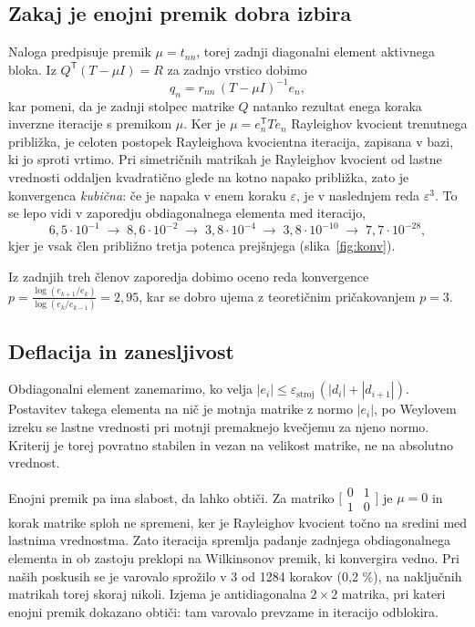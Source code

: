 \documentclass[11pt,a4paper]{article}
\begin{document}
\subsection{Zakaj je enojni premik dobra izbira}
 
Naloga predpisuje premik $\mu = t_{nn}$, torej zadnji diagonalni element
aktivnega bloka. Iz $Q^{\mathsf T}(T-\mu I) = R$ za
zadnjo vrstico dobimo
\begin{equation}
  q_n = r_{nn}\,(T-\mu I)^{-1} e_n ,
\end{equation}
kar pomeni, da je zadnji stolpec matrike $Q$ natanko rezultat enega koraka
inverzne iteracije s premikom $\mu$. Ker je $\mu = e_n^{\mathsf T} T e_n$
Rayleighov kvocient trenutnega približka, je celoten postopek Rayleighova
kvocientna iteracija, zapisana v bazi, ki jo sproti vrtimo. Pri simetričnih
matrikah je Rayleighov kvocient od lastne vrednosti oddaljen kvadratično glede
na kotno napako približka, zato je konvergenca \emph{kubična}: če je napaka v
enem koraku $\varepsilon$, je v naslednjem reda $\varepsilon^3$. To se lepo vidi
v zaporedju obdiagonalnega elementa med iteracijo,
\[
  6{,}5\cdot 10^{-1} \;\to\;
  8{,}6\cdot 10^{-2} \;\to\;
  3{,}8\cdot 10^{-4} \;\to\;
  3{,}8\cdot 10^{-10} \;\to\;
  7{,}7\cdot 10^{-28},
\]
kjer je vsak člen približno tretja potenca prejšnjega (slika~\ref{fig:konv}).

Iz zadnjih treh členov zaporedja dobimo oceno reda konvergence $p = \frac{\log(e_{k+1}/e_k)}{\log(e_k/e_{k-1})} = 2{,}95$, 
kar se dobro ujema z teoretičnim pričakovanjem $p = 3$.
 
\subsection{Deflacija in zanesljivost}
 
Obdiagonalni element zanemarimo, ko velja
$|e_i| \le \varepsilon_{\mathrm{stroj}}\,(|d_i| + |d_{i+1}|)$. Postavitev takega
elementa na nič je motnja matrike z normo $|e_i|$, po Weylovem izreku se
lastne vrednosti pri motnji premaknejo kvečjemu za njeno normo. Kriterij je
torej povratno stabilen in vezan na velikost matrike, ne na absolutno vrednost.
 
Enojni premik pa ima slabost, da lahko obtiči. Za matriko
$\bigl[\begin{smallmatrix}0&1\\1&0\end{smallmatrix}\bigr]$ je $\mu = 0$ in korak
matrike sploh ne spremeni, ker je Rayleighov kvocient točno na sredini med
lastnima vrednostma. Zato iteracija spremlja padanje zadnjega obdiagonalnega
elementa in ob zastoju preklopi na Wilkinsonov premik, ki konvergira vedno. 
Pri naših poskusih se je varovalo sprožilo v 3 od 1284 korakov (0,2 \%), 
na naključnih matrikah torej skoraj nikoli. Izjema je antidiagonalna $2\times 2$ matrika, 
pri kateri enojni premik dokazano obtiči: tam varovalo prevzame in iteracijo odblokira.
 
\end{document}
